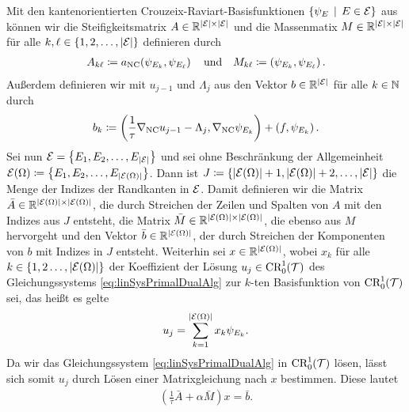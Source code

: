\begin{remark} 
  \label{rem:primalDualMatrixEquations}
  Mit den kantenorientierten Crouzeix-Raviart-Basisfunktionen
  $\{\psi_E\,\mid\,E\in\mathcal{E}\}$ aus  können
  wir die Steifigkeitsmatrix $A\in\mathbb{R}^{|\mathcal{E}|\times|\mathcal{E}|}$ und die
  Massenmatix $M\in\mathbb{R}^{|\mathcal{E}|\times|\mathcal{E}|}$ für alle
  $k,\ell\in\{1,2,\ldots,|\mathcal{E}|\}$ definieren durch
  \begin{align*}
    A_{k\ell}\coloneqq a_\textup{NC}\!\left(\psi_{E_k},\psi_{E_\ell}\right)
    \quad\text{und}\quad
    M_{k\ell}\coloneqq \left(\psi_{E_k},\psi_{E_\ell}\right).
  \end{align*}
  Außerdem definieren wir mit $u_{j-1}$ und $\Lambda_j$ aus
   den Vektor $b\in\mathbb{R}^{|\mathcal{E}|}$ für alle
  $k\in\mathbb{N}$ durch
  \begin{align*}
    b_k\coloneqq 
    \left(\frac{1}{\tau}\nabla_\textup{NC} u_{j-1}-\Lambda_j,\nabla_\textup{NC}\psi_{E_k}\right)
    + \left( f,\psi_{E_k} \right).
  \end{align*}
  Sei nun $\mathcal{E}=\left\{E_1,E_2,\ldots,E_{|\mathcal{E}|}\right\}$ und sei ohne
  Beschränkung der Allgemeinheit 
  $\mathcal{E}(\Omega)\coloneqq\left\{E_1,E_2,\ldots,E_{|\mathcal{E}(\Omega)|}\right\}$.  
  Dann ist $J\coloneqq\{|\mathcal{E}(\Omega)|+1,|\mathcal{E}(\Omega)|+2,\ldots,|\mathcal{E}|\}$
  die Menge der Indizes der Randkanten in $\mathcal{E}$.
  Damit definieren wir die Matrix $\bar
  A\in\mathbb{R}^{|\mathcal{E}(\Omega)|\times|\mathcal{E}(\Omega)|}$, die durch Streichen der
  Zeilen und Spalten von $A$ mit den Indizes aus $J$ entsteht, die Matrix $\bar
  M\in\mathbb{R}^{|\mathcal{E}(\Omega)|\times|\mathcal{E}(\Omega)|}$, die ebenso aus $M$
  hervorgeht und den Vektor $\bar b\in\mathbb{R}^{|\mathcal{E}(\Omega)|}$, der durch
  Streichen der Komponenten von $b$ mit Indizes in $J$ entsteht.
  Weiterhin sei $x\in\mathbb{R}^{|\mathcal{E}(\Omega)|}$, wobei $x_k$ für alle
  $k\in\{1,2\ldots,|\mathcal{E}(\Omega)|\}$ der Koeffizient der Lösung 
  $u_j\in\textup{CR}^1_0(\mathcal{T})$ des
  Gleichungssystems \eqref{eq:linSysPrimalDualAlg} zur $k$-ten Basisfunktion
  von $\textup{CR}^1_0(\mathcal{T})$ sei, das heißt es gelte
  \begin{align*}
    u_j=\sum_{k=1}^{|\mathcal{E}(\Omega)|} x_k\psi_{E_k}.
  \end{align*}
  Da wir das Gleichungssystem \eqref{eq:linSysPrimalDualAlg} in
  $\textup{CR}^1_0(\mathcal{T})$ lösen, lässt sich somit $u_j$ durch Lösen einer
  Matrixgleichung nach $x$ bestimmen. 
  Diese lautet
  \begin{align}
    \label{eq:linSysPrimalDualAlgMatrixEq}
    \left(\frac{1}{\tau}\bar A+\alpha \bar M\right)x=\bar b.
  \end{align}
\end{remark}

